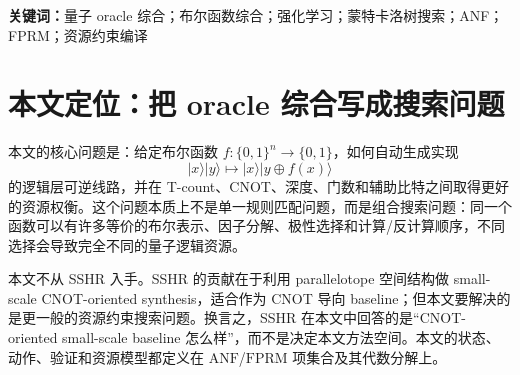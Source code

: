 \documentclass[UTF8,fontset=macnew,11pt]{ctexart}
\newcommand{\method}{Resource-NMCTS}
\newcommand{\anf}{\ensuremath{\mathrm{ANF}}}
\newcommand{\fprm}{\ensuremath{\mathrm{FPRM}}}
\newcommand{\xor}{\ensuremath{\oplus}}
\newcommand{\rz}{\ensuremath{R_z}}
\begin{document}
\begin{abstract}
本文同时报告 gate-set 边界。RevKit Python \texttt{oracle\_synth} 在 177 个函数上全部返回，但 171/177 行含非 Clifford \rz{}，总数为 9242，因此其 lower-bound phase netlist 不能直接当作精确 Clifford+T T-count 对比。为把该边界推进到项目内部，本文实现 phase-parity \anf{} emitter：将每个 \anf{} 单项式精确展开为 parity-phase gadgets，177/177 个函数均验证为 phase oracle up to global phase。该 emitter 相对 RevKit lower-bound score 为 40/137/0、平均高 69.25\%，但在每个非 Clifford \rz{} 加 1 个 score 单位后转为 177/0/0、平均降低 48.16\%，在 $T/R_z=30$ 近似旋转综合 proxy 下为 177/0/0、平均降低 64.98\%。进一步地，本文把 phase search 从 fixed-polarity \fprm{} 扩展到 Affine-FPRM：先在有界可逆线性变换 $B$ 下综合 $h(y)=f(B^{-1}y)$，再枚举极性 $p$ 得到 $g(z)=h(z\xor p)$，并把选中的 parity mask 精确翻译回原变量。Affine-FPRM 三个 rank metric 共 531 行全部验证通过；其中 $T/R_z=30$ 目标在 81/177 个函数选择非 identity 线性变换，相对 fixed-polarity FPRM 为 81/0/96、平均 score 降低 2.51\%，相对 phase-parity \anf{} 为 85/0/92、平均降低 2.98\%，相对 RevKit $T/R_z=30$ proxy 为 177/0/0、平均降低 65.50\%。这说明 phase/Rz 分支已经从成本敏感性和极性枚举推进到可验证的仿射代数预条件搜索；但它仍是逻辑层 phase-oracle emitter，不输出近似旋转序列，也不包含硬件 mapping。阶段性结论是：\method{} 已经形成一条独立于 SSHR、以低 T-count 与低加权逻辑资源为目标的 Boolean oracle synthesis 主线；当前缺口是更强的学习式 phase/Rz-aware search、官方 ROS 或 legacy RevKit/CirKit 完整复现，以及投稿级图表与论证收敛。
\end{abstract}

\noindent\textbf{关键词：}量子 oracle 综合；布尔函数综合；强化学习；蒙特卡洛树搜索；ANF；FPRM；资源约束编译

\section{本文定位：把 oracle 综合写成搜索问题}

本文的核心问题是：给定布尔函数 $f:\{0,1\}^n\rightarrow\{0,1\}$，如何自动生成实现
\begin{equation}
  |x\rangle |y\rangle \mapsto |x\rangle |y\xor f(x)\rangle
  \label{eq:oracle}
\end{equation}
的逻辑层可逆线路，并在 T-count、CNOT、深度、门数和辅助比特之间取得更好的资源权衡。这个问题本质上不是单一规则匹配问题，而是组合搜索问题：同一个函数可以有许多等价的布尔表示、因子分解、极性选择和计算/反计算顺序，不同选择会导致完全不同的量子逻辑资源。

本文不从 SSHR 入手。SSHR 的贡献在于利用 parallelotope 空间结构做 small-scale CNOT-oriented synthesis\cite{zheng2025sshr}，适合作为 CNOT 导向 baseline；但本文要解决的是更一般的资源约束搜索问题。换言之，SSHR 在本文中回答的是“CNOT-oriented small-scale baseline 怎么样”，而不是决定本文方法空间。本文的状态、动作、验证和资源模型都定义在 \anf{}/\fprm{} 项集合及其代数分解上。
\end{document}
